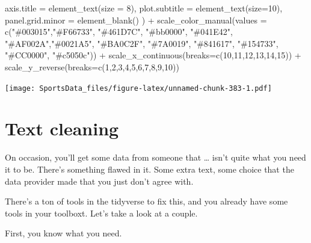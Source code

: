 \documentclass[
]{book}
\newenvironment{Shaded}{\begin{snugshade}}{\end{snugshade}}
\newcommand{\AttributeTok}[1]{\textcolor[rgb]{0.77,0.63,0.00}{#1}}
\newcommand{\DecValTok}[1]{\textcolor[rgb]{0.00,0.00,0.81}{#1}}
\newcommand{\FunctionTok}[1]{\textcolor[rgb]{0.00,0.00,0.00}{#1}}
\newcommand{\NormalTok}[1]{#1}
\newcommand{\SpecialCharTok}[1]{\textcolor[rgb]{0.00,0.00,0.00}{#1}}
\newcommand{\StringTok}[1]{\textcolor[rgb]{0.31,0.60,0.02}{#1}}
\begin{document}
\begin{Shaded}
\begin{Highlighting}[]
    \AttributeTok{axis.title =} \FunctionTok{element\_text}\NormalTok{(}\AttributeTok{size =} \DecValTok{8}\NormalTok{), }
    \AttributeTok{plot.subtitle =} \FunctionTok{element\_text}\NormalTok{(}\AttributeTok{size=}\DecValTok{10}\NormalTok{), }
    \AttributeTok{panel.grid.minor =} \FunctionTok{element\_blank}\NormalTok{()}
\NormalTok{    ) }\SpecialCharTok{+}
  \FunctionTok{scale\_color\_manual}\NormalTok{(}\AttributeTok{values =} \FunctionTok{c}\NormalTok{(}\StringTok{"\#003015"}\NormalTok{,}\StringTok{"\#F66733"}\NormalTok{, }\StringTok{"\#461D7C"}\NormalTok{, }\StringTok{"\#bb0000"}\NormalTok{, }\StringTok{"\#041E42"}\NormalTok{, }\StringTok{"\#AF002A"}\NormalTok{,}\StringTok{"\#0021A5"}\NormalTok{, }\StringTok{"\#BA0C2F"}\NormalTok{, }\StringTok{"\#7A0019"}\NormalTok{, }\StringTok{"\#841617"}\NormalTok{, }\StringTok{"\#154733"}\NormalTok{, }\StringTok{"\#CC0000"}\NormalTok{, }\StringTok{"\#c5050c"}\NormalTok{)) }\SpecialCharTok{+}
  \FunctionTok{scale\_x\_continuous}\NormalTok{(}\AttributeTok{breaks=}\FunctionTok{c}\NormalTok{(}\DecValTok{10}\NormalTok{,}\DecValTok{11}\NormalTok{,}\DecValTok{12}\NormalTok{,}\DecValTok{13}\NormalTok{,}\DecValTok{14}\NormalTok{,}\DecValTok{15}\NormalTok{)) }\SpecialCharTok{+} 
  \FunctionTok{scale\_y\_reverse}\NormalTok{(}\AttributeTok{breaks=}\FunctionTok{c}\NormalTok{(}\DecValTok{1}\NormalTok{,}\DecValTok{2}\NormalTok{,}\DecValTok{3}\NormalTok{,}\DecValTok{4}\NormalTok{,}\DecValTok{5}\NormalTok{,}\DecValTok{6}\NormalTok{,}\DecValTok{7}\NormalTok{,}\DecValTok{8}\NormalTok{,}\DecValTok{9}\NormalTok{,}\DecValTok{10}\NormalTok{))}
\end{Highlighting}
\end{Shaded}

\texttt{[image: SportsData\_files/figure-latex/unnamed-chunk-383-1.pdf]}

\hypertarget{text-cleaning}{%
\chapter{Text cleaning}\label{text-cleaning}}

On occasion, you'll get some data from someone that \ldots{} isn't quite what you need it to be. There's something flawed in it. Some extra text, some choice that the data provider made that you just don't agree with.

There's a ton of tools in the tidyverse to fix this, and you already have some tools in your toolboxt. Let's take a look at a couple.

First, you know what you need.
\end{document}
